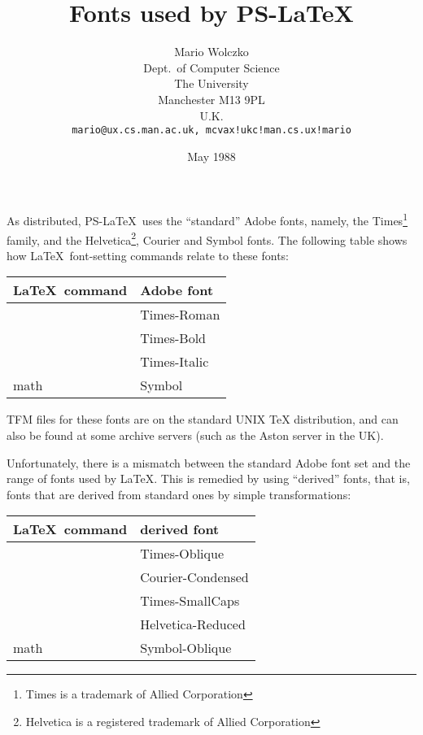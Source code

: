 
\newcommand{\cs}[1]{{\tt \string#1}}
\newcommand{\pslatex}{PS-\LaTeX}
\newcommand{\ps}{PostScript}

\title{Fonts used by \pslatex}

\author{Mario Wolczko\\
Dept.~of Computer Science\\
The University\\
Manchester M13 9PL\\
U.K.\\
{\tt mario@ux.cs.man.ac.uk, mcvax!ukc!man.cs.ux!mario}}

\date{May 1988}


\maketitle

As distributed, \pslatex\ uses the ``standard'' Adobe fonts, namely,
the Times\footnote{Times is a trademark of Allied Corporation} family,
and the Helvetica\footnote{Helvetica is a registered trademark of Allied
Corporation}, Courier and Symbol fonts.  The following table shows how
\LaTeX\ font-setting commands relate to these fonts:
\begin{center}
\begin{tabular}{|l|l|}
\hline
\LaTeX\ command & Adobe font\\
\hline
\cs\rm & Times-Roman\\
\cs\bf & Times-Bold\\
\cs\it & Times-Italic\\
math   & Symbol\\
\hline
\end{tabular}
\end{center}
TFM files for these fonts are on the standard UNIX TeX distribution,
and can also be found at some archive servers (such as the Aston
server in the UK).

Unfortunately, there is a mismatch between the standard Adobe font set
and the range of fonts used by \LaTeX.  This is remedied by using
``derived'' fonts, that is, fonts that are derived from standard ones
by simple transformations:
\begin{center}
\begin{tabular}{|l|l|}
\hline
\LaTeX\ command & derived font\\
\hline
\cs\sl & Times-Oblique\\
\cs\tt & Courier-Condensed\\
\cs\sc & Times-SmallCaps\\
\cs\sf & Helvetica-Reduced\\
math & Symbol-Oblique\\
\hline
\end{tabular}
\end{center}

